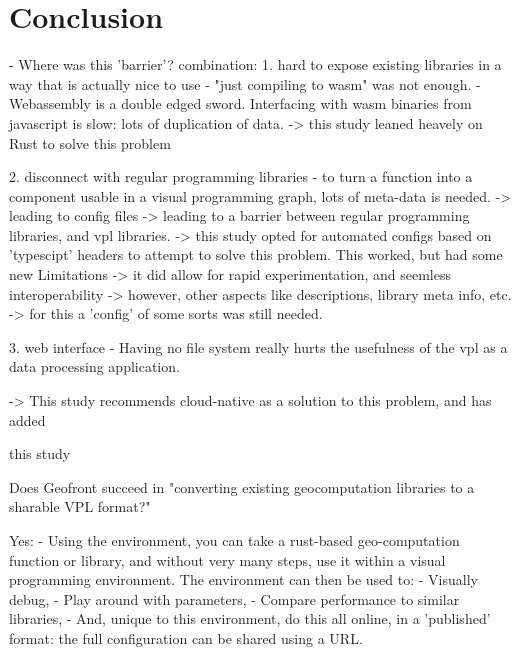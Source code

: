 


\section{Conclusion}

\begin{note}
  
- Where was this 'barrier'?
combination: 
1. hard to expose existing libraries in a way that is actually nice to use
- "just compiling to wasm" was not enough.
- Webassembly is a double edged sword. Interfacing with wasm binaries from javascript is slow: lots of duplication of data. 
-> this study leaned heavely on Rust to solve this problem

2. disconnect with regular programming libraries
- to turn a function into a component usable in a visual programming graph, lots of meta-data is needed. 
  -> leading to config files 
  -> leading to a barrier between regular programming libraries, and vpl libraries. 
  -> this study opted for automated configs based on 'typescipt' headers to attempt to solve this problem. This worked, but had some new Limitations
     -> it did allow for rapid experimentation, and seemless interoperability
     -> however, other aspects like descriptions, library meta info, etc. 
     -> for this a 'config' of some sorts was still needed. 

3. web interface
- Having no file system really hurts the usefulness of the vpl as a data processing application.

-> This study recommends cloud-native as a solution to this problem, and has added 


this study 



Does Geofront succeed in "converting existing geocomputation libraries to a sharable VPL format?" 

Yes: 
 - Using the environment, you can take a rust-based geo-computation function or library, 
   and without very many steps, use it within a visual programming environment. 
   The environment can then be used to:
   - Visually debug, 
   - Play around with parameters, 
   - Compare performance to similar libraries,
   - And, unique to this environment, do this all online, in a 'published' format: the full configuration can be shared using a URL. 


\end{note}

